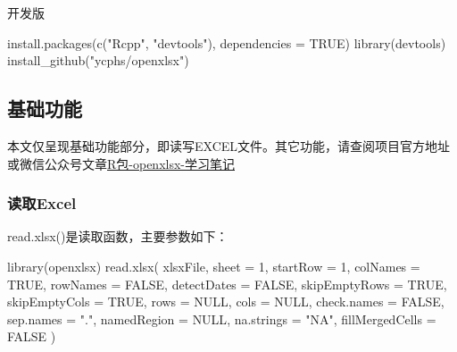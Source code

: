 \documentclass[
]{book}
\newenvironment{Shaded}{\begin{snugshade}}{\end{snugshade}}
\newcommand{\AttributeTok}[1]{\textcolor[rgb]{0.77,0.63,0.00}{#1}}
\newcommand{\ConstantTok}[1]{\textcolor[rgb]{0.00,0.00,0.00}{#1}}
\newcommand{\DecValTok}[1]{\textcolor[rgb]{0.00,0.00,0.81}{#1}}
\newcommand{\FunctionTok}[1]{\textcolor[rgb]{0.00,0.00,0.00}{#1}}
\newcommand{\NormalTok}[1]{#1}
\newcommand{\StringTok}[1]{\textcolor[rgb]{0.31,0.60,0.02}{#1}}
\begin{document}
开发版

\begin{Shaded}
\begin{Highlighting}[]
\FunctionTok{install.packages}\NormalTok{(}\FunctionTok{c}\NormalTok{(}\StringTok{"Rcpp"}\NormalTok{, }\StringTok{"devtools"}\NormalTok{), }\AttributeTok{dependencies =} \ConstantTok{TRUE}\NormalTok{)}
\FunctionTok{library}\NormalTok{(devtools)}
\FunctionTok{install\_github}\NormalTok{(}\StringTok{"ycphs/openxlsx"}\NormalTok{)}
\end{Highlighting}
\end{Shaded}

\hypertarget{openxlsx:functions}{%
\subsection{基础功能}\label{openxlsx:functions}}

本文仅呈现基础功能部分，即读写EXCEL文件。其它功能，请查阅项目官方地址或微信公众号文章\href{https://mp.weixin.qq.com/s/ZD0dJb0y8fsWGI1dCPh2mQ}{R包-openxlsx-学习笔记}

\hypertarget{openxlsx:read-function}{%
\subsubsection{读取Excel}\label{openxlsx:read-function}}

read.xlsx()是读取函数，主要参数如下：

\begin{Shaded}
\begin{Highlighting}[]
\FunctionTok{library}\NormalTok{(openxlsx)}
\FunctionTok{read.xlsx}\NormalTok{(}
\NormalTok{  xlsxFile,}
  \AttributeTok{sheet =} \DecValTok{1}\NormalTok{,}
  \AttributeTok{startRow =} \DecValTok{1}\NormalTok{,}
  \AttributeTok{colNames =} \ConstantTok{TRUE}\NormalTok{,}
  \AttributeTok{rowNames =} \ConstantTok{FALSE}\NormalTok{,}
  \AttributeTok{detectDates =} \ConstantTok{FALSE}\NormalTok{,}
  \AttributeTok{skipEmptyRows =} \ConstantTok{TRUE}\NormalTok{,}
  \AttributeTok{skipEmptyCols =} \ConstantTok{TRUE}\NormalTok{,}
  \AttributeTok{rows =} \ConstantTok{NULL}\NormalTok{,}
  \AttributeTok{cols =} \ConstantTok{NULL}\NormalTok{,}
  \AttributeTok{check.names =} \ConstantTok{FALSE}\NormalTok{,}
  \AttributeTok{sep.names =} \StringTok{"."}\NormalTok{,}
  \AttributeTok{namedRegion =} \ConstantTok{NULL}\NormalTok{,}
  \AttributeTok{na.strings =} \StringTok{"NA"}\NormalTok{,}
  \AttributeTok{fillMergedCells =} \ConstantTok{FALSE}
\NormalTok{)}
\end{Highlighting}
\end{Shaded}
\end{document}
